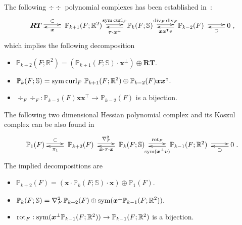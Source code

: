 The following $\div\div$ polynomial complexes has been established in~\cite{ChenHuang2020}:
\begin{equation}\label{eq:divdivcomplexPolydouble}
\xymatrix{
\boldsymbol{RT}\ar@<0.4ex>[r]^-{\subset} & \; \mathbb P_{k+1}(F;\mathbb R^2)\; \ar@<0.4ex>[r]^-{\sym\curl_F}\ar@<0.4ex>[l]^-{\boldsymbol x}  & \; \mathbb P_k(F;\mathbb S) \ar@<0.4ex>[r]^-{\div_F{\div}_F}\; \ar@<0.4ex>[l]^-{\boldsymbol  \tau\cdot \boldsymbol x^{\bot}} & \; \mathbb P_{k-2}(F)  \; \ar@<0.4ex>[r]^-{} \ar@<0.4ex>[l]^-{ \boldsymbol x \boldsymbol x^{\intercal}v}
& 0 \ar@<0.4ex>[l]^-{\supset} },
\end{equation}
which implies the following decomposition
\begin{itemize}
 \item $\mathbb P_{k+2}(F; \mathbb R^2)= (\mathbb P_{k+1}(F; \mathbb S)\cdot\boldsymbol x^{\bot})\oplus\boldsymbol{RT}.$
 \smallskip 
 \item $\displaystyle
\mathbb P_{k}(F; \mathbb S)=\operatorname{sym}\operatorname{curl}_F \, \mathbb P_{k+1}(F; \mathbb R^2) \oplus \mathbb P_{k-2}(F)\boldsymbol  x\boldsymbol  x^{\intercal}.
$

 \smallskip
 \item $\div_F\div_F: \mathbb P_{k-2}(F)\boldsymbol  x\boldsymbol  x^{\intercal}\to\mathbb P_{k-2}(F)$ is a bijection.
\end{itemize}
%
The following two dimensional Hessian polynomial complex and its Koszul complex can be also found in~\cite[Section 3.1]{ChenHuang2020}
\begin{equation}\label{eq:hessiancomplexPolydouble}
\xymatrix{
\mathbb P_1(F)\ar@<0.4ex>[r]^-{\subset} & \; \mathbb P_{k+2}(F)\; \ar@<0.4ex>[r]^-{\nabla_F^2}\ar@<0.4ex>[l]^-{\pi_1}  & \; \mathbb P_k(F;\mathbb S) \ar@<0.4ex>[r]^-{\rot_F}\; \ar@<0.4ex>[l]^-{\boldsymbol  x\cdot \boldsymbol  \tau \cdot \boldsymbol x} & \; \mathbb P_{k-1}(F; \mathbb R^2)  \; \ar@<0.4ex>[r]^-{} \ar@<0.4ex>[l]^-{\sym(\boldsymbol  x^{\perp}\boldsymbol  v )}
& 0 \ar@<0.4ex>[l]^-{\supset} }.
\end{equation}
The implied decompositions are
\begin{itemize}
 \item $\mathbb P_{k+2}(F)= (\boldsymbol x\cdot\mathbb P_{k}(F; \mathbb S) \cdot \boldsymbol  x) \oplus\mathbb P_1(F).$
 \smallskip 
 \item $\displaystyle
\mathbb P_{k}(F; \mathbb S)=\nabla_F^2 \, \mathbb P_{k+2}(F) \oplus \operatorname{sym} (\boldsymbol x^{\perp}\mathbb P_{k-1}(F; \mathbb R^2)).
$

 \smallskip
 \item $ \operatorname*{rot}_F: \operatorname{sym} (\boldsymbol x^{\perp}\mathbb P_{k-1}(F; \mathbb R^2))\to\mathbb P_{k-1}(F; \mathbb R^2)$ is a bijection.
\end{itemize}

